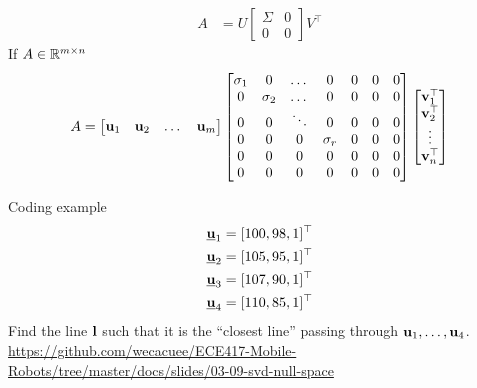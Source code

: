 \documentclass[times,t]{beamer}
\begin{document}
\begin{frame}
  \begin{align}
    A  &=   U  \begin{bmatrix}\Sigma   &  0  \\   0  &  0 \end{bmatrix} V^\top
  \end{align}
  If $A \in \mathbb{R}^{m \times n}$
  \begin{align}
    A = \begin{bmatrix}
      \mathbf{u}_1 & \mathbf{u}_2 & \dots & \mathbf{u}_m
    \end{bmatrix} \begin{bmatrix}
                 \sigma_1  & 0 & \dots & 0 & 0 & 0 & 0 \\
                 0 & \sigma_2 & \dots & 0 & 0 & 0 & 0\\
                 0 & 0 & \ddots & 0 & 0 & 0 & 0 \\
                 0 & 0 & 0 & \sigma_r & 0 & 0 & 0\\
                 0 & 0 & 0 & 0 & 0 & 0 & 0 \\
                 0 & 0 & 0 & 0 & 0 & 0 & 0
               \end{bmatrix}
                                     \begin{bmatrix}
                                       \mathbf{v}_1^\top \\
                                       \mathbf{v}_2^\top \\
                                       \vdots \\
                                       \mathbf{v}_n^\top
                                       \end{bmatrix}
  \end{align}
\end{frame}


\begin{frame}{Coding example}
  \begin{align*}
    \underline{\mathbf{u}}_1 &= [100, 98, 1]^\top\\
    \underline{\mathbf{u}}_2 &= [105, 95, 1]^\top\\
    \underline{\mathbf{u}}_3 &= [107, 90, 1]^\top\\
    \underline{\mathbf{u}}_4 &= [110, 85, 1]^\top
  \end{align*}
  Find  the line $\mathbf{l}$ such that it is the ``closest line'' passing through
  $\mathbf{u}_1, \dots, \mathbf{u}_4$.
  \url{https://github.com/wecacuee/ECE417-Mobile-Robots/tree/master/docs/slides/03-09-svd-null-space}
\end{frame}
\end{document}

